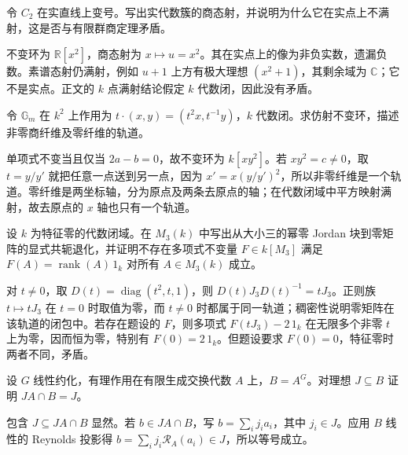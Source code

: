 \begin{optionalexercise}\label{b5:ex:22-finite-quotient-real}
	令 \(C_2\) 在实直线上变号。写出实代数簇的商态射，并说明为什么它在实点上不满射，这是否与有限群商定理矛盾。
\end{optionalexercise}
\begin{solution}
	不变环为 \(\mathbb R[x^2]\)，商态射为 \(x\mapsto u=x^2\)。其在实点上的像为非负实数，遗漏负数。素谱态射仍满射，例如 \(u+1\) 上方有极大理想 \((x^2+1)\)，其剩余域为 \(\mathbb C\)；它不是实点。正文的 \(k\) 点满射结论假定 \(k\) 代数闭，因此没有矛盾。
\end{solution}

\begin{optionalexercise}\label{b5:ex:22-torus-weight-two}
	令 \(\mathbb G_m\) 在 \(k^2\) 上作用为 \(t\cdot(x,y)=(t^2x,t^{-1}y)\)，\(k\) 代数闭。求仿射不变环，描述非零商纤维及零纤维的轨道。
\end{optionalexercise}
\begin{solution}
	单项式不变当且仅当 \(2a-b=0\)，故不变环为 \(k[xy^2]\)。若 \(xy^2=c\ne0\)，取 \(t=y/y'\) 就把任意一点送到另一点，因为 \(x'=x(y/y')^2\)，所以非零纤维是一个轨道。零纤维是两坐标轴，分为原点及两条去原点的轴；在代数闭域中平方映射满射，故去原点的 \(x\) 轴也只有一个轨道。
\end{solution}

\begin{optionalexercise}\label{b5:ex:22-nilpotent-degeneration}
	设 \(k\) 为特征零的代数闭域。在 \(M_3(k)\) 中写出从大小三的幂零 Jordan 块到零矩阵的显式共轭退化，并证明不存在多项式不变量 \(F\in k[M_3]\) 满足 \(F(A)=\operatorname{rank}(A)\,1_k\) 对所有 \(A\in M_3(k)\) 成立。
\end{optionalexercise}
\begin{solution}
	对 \(t\ne0\)，取 \(D(t)=\operatorname{diag}(t^2,t,1)\)，则 \(D(t)J_3D(t)^{-1}=tJ_3\)。正则族 \(t\mapsto tJ_3\) 在 \(t=0\) 时取值为零，而 \(t\ne0\) 时都属于同一轨道；稠密性说明零矩阵在该轨道的闭包中。若存在题设的 \(F\)，则多项式 \(F(tJ_3)-2\,1_k\) 在无限多个非零 \(t\) 上为零，因而恒为零，特别有 \(F(0)=2\,1_k\)。但题设要求 \(F(0)=0\)，特征零时两者不同，矛盾。
\end{solution}

\begin{optionalexercise}\label{b5:ex:22-reynolds-ideal-contraction}
	设 \(G\) 线性约化，有理作用在有限生成交换代数 \(A\) 上，\(B=A^G\)。对理想 \(J\subseteq B\) 证明 \(JA\cap B=J\)。
\end{optionalexercise}
\begin{solution}
	包含 \(J\subseteq JA\cap B\) 显然。若 \(b\in JA\cap B\)，写 \(b=\sum_i j_i a_i\)，其中 \(j_i\in J\)。应用 \(B\) 线性的 Reynolds 投影得 \(b=\sum_i j_i\mathcal R_A(a_i)\in J\)，所以等号成立。
\end{solution}

